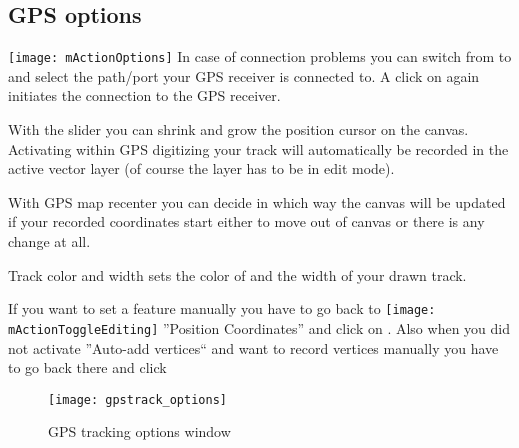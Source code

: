 \subsection{GPS options}
\texttt{[image: mActionOptions]} In case of connection
problems you can switch from  to  and select the path/port your GPS receiver is connected to.
A click on  again initiates the connection to the GPS
receiver.

With the slider  you can shrink and grow the position
cursor on the canvas. Activating  within GPS
digitizing your track will automatically be recorded in the active vector layer
(of course the layer has to be in edit mode).

With GPS map recenter you can decide in which way the canvas will be
updated if your recorded coordinates start either to move out of canvas
or there is any change at all.

Track color and width sets the color of and the width of your drawn track.

If you want to set a feature manually you have to go back to
\texttt{[image: mActionToggleEditing]} ''Position Coordinates''
and click on . Also when you did not activate ''Auto-add vertices``
and want to record vertices manually you have to go back there and
click 

\begin{figure}[ht]
   \centering
   \texttt{[image: gpstrack\_options]}
   \caption{GPS tracking options window \nixcaption}
   \label{fig:gpstrack_options}
\end{figure}

\FloatBarrier
